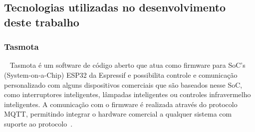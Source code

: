 \subsection{Tecnologias utilizadas no desenvolvimento deste trabalho}
\subsubsection{Tasmota}
~\label{sec:tasmota}
Tasmota é um software de código aberto que atua como firmware para SoC’s (System-on-a-Chip) ESP32 
da Espressif e possibilita controle e comunicação personalizado com alguns dispositivos comerciais que são 
baseados nesse SoC, como interruptores inteligentes, lâmpadas inteligentes ou controles infravermelho
inteligentes.
A comunicação com o firmware é realizada através do protocolo MQTT, permitindo integrar o hardware comercial
a qualquer sistema com suporte ao protocolo~\cite{tasmota-1}.

